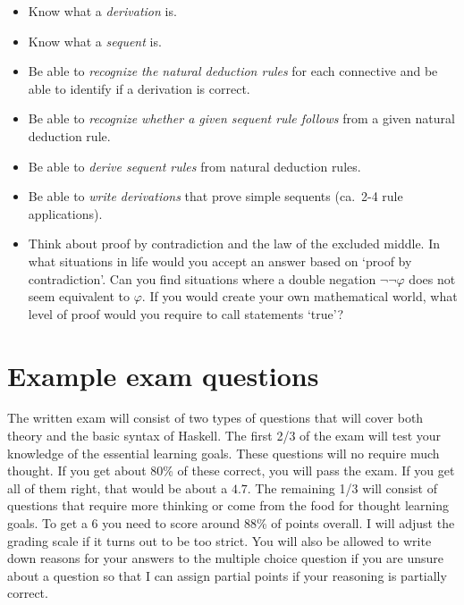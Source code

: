 \documentclass{article}[12pt]
\begin{document}
\begin{itemize}
    \item[\twemoji{slightly smiling face}] Know what a \emph{derivation} is.
    \item[\twemoji{slightly smiling face}] Know what a \emph{sequent} is.
    \item[\twemoji{slightly smiling face}] Be able to \emph{recognize the natural deduction rules} for each connective and be able to identify if a derivation is correct.
    \item[\twemoji{slightly smiling face}] Be able to \emph{recognize whether a given sequent rule follows} from a given natural deduction rule.
    \item[\twemoji{thinking face}] Be able to \emph{derive sequent rules} from natural deduction rules.
    \item[\twemoji{thinking face}] Be able to \emph{write derivations} that prove simple sequents (ca.~2-4 rule applications).
    \item[\twemoji{exploding head}] Think about proof by contradiction and the law of the excluded middle. In what situations in life would you accept an answer based on `proof by contradiction'. Can you find situations where a double negation $\neg \neg \varphi$ does not seem equivalent to $\varphi$. If you would create your own mathematical world, what level of proof would you require to call statements `true'?
\end{itemize}

\section{Example exam questions}
The written exam will consist of two types of questions that will cover both theory and the basic syntax of Haskell. The first 2/3 of the exam will test your knowledge of the essential learning goals. These questions will no require much thought. If you get about 80\% of these correct, you will pass the exam. If you get all of them right, that would be about a $4.7$. The remaining 1/3 will consist of questions that require more thinking or come from the food for thought learning goals. To get a $6$ you need to score around 88\% of points overall. I will adjust the grading scale if it turns out to be too strict. You will also be allowed to write down reasons for your answers to the multiple choice question if you are unsure about a question so that I can assign partial points if your reasoning is partially correct.
\end{document}
